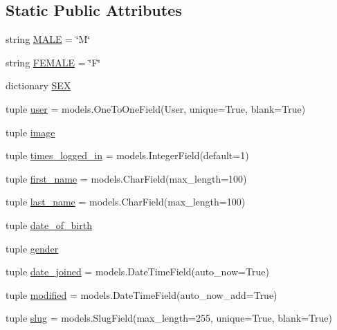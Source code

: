 \subsection*{Static Public Attributes}
\begin{DoxyCompactItemize}
\item 
string \hyperlink{classstudents_1_1models_1_1_student_ab3c1ac4f87bcca2bb3e6bcf319aef7b7}{M\-A\-L\-E} = \char`\"{}M\char`\"{}
\item 
string \hyperlink{classstudents_1_1models_1_1_student_a8de6077045683c830b41fcd0a41c4a8a}{F\-E\-M\-A\-L\-E} = \char`\"{}F\char`\"{}
\item 
dictionary \hyperlink{classstudents_1_1models_1_1_student_a2a85491d6d3ae6efdbdd58da14ec01fa}{S\-E\-X}
\item 
tuple \hyperlink{classstudents_1_1models_1_1_student_a7c56f44c930c1bcdd80f8f8860af5bee}{user} = models.\-One\-To\-One\-Field(User, unique=True, blank=True)
\item 
tuple \hyperlink{classstudents_1_1models_1_1_student_a37eca324de73539147a0083dfdf735ac}{image}
\item 
tuple \hyperlink{classstudents_1_1models_1_1_student_a9254eb630a5d3de52a566b11c8ab6f1b}{times\-\_\-logged\-\_\-in} = models.\-Integer\-Field(default=1)
\item 
tuple \hyperlink{classstudents_1_1models_1_1_student_a3fa9119af0d1c42d0beafad3d90b8153}{first\-\_\-name} = models.\-Char\-Field(max\-\_\-length=100)
\item 
tuple \hyperlink{classstudents_1_1models_1_1_student_a851aa51a430028eb921054a10e79a599}{last\-\_\-name} = models.\-Char\-Field(max\-\_\-length=100)
\item 
tuple \hyperlink{classstudents_1_1models_1_1_student_af7f5dc2a714b4a00ceac864f96a5126c}{date\-\_\-of\-\_\-birth}
\item 
tuple \hyperlink{classstudents_1_1models_1_1_student_ae8f0e56e008cc61770d2f0f5b5ca6182}{gender}
\item 
tuple \hyperlink{classstudents_1_1models_1_1_student_a904985debef148d1871397fbdd756c91}{date\-\_\-joined} = models.\-Date\-Time\-Field(auto\-\_\-now=True)
\item 
tuple \hyperlink{classstudents_1_1models_1_1_student_aa7e41320bd36856721a6401b23a7eb3e}{modified} = models.\-Date\-Time\-Field(auto\-\_\-now\-\_\-add=True)
\item 
tuple \hyperlink{classstudents_1_1models_1_1_student_ad676823e45f40a8f3bd16e2cb2a96946}{slug} = models.\-Slug\-Field(max\-\_\-length=255, unique=True, blank=True)

\end{DoxyCompactItemize}
